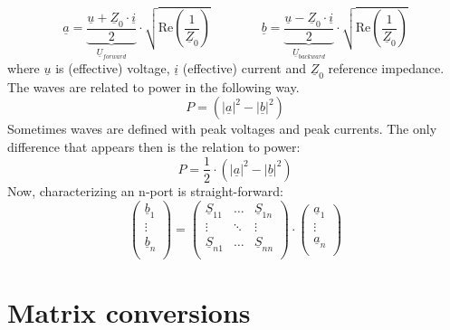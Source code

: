 \begin{equation}
\underline{a} =
  \underbrace{\dfrac{\underline{u}+\underline{Z}_0\cdot \underline{i}}{2}}_{\underline{U}_{forward}}
  \cdot \sqrt{\text{Re}\left(\dfrac{1}{\underline{Z}_0}\right)}
\qquad\qquad
\underline{b} =
  \underbrace{\dfrac{\underline{u}-\underline{Z}_0\cdot \underline{i}}{2}}_{\underline{U}_{backward}}
  \cdot \sqrt{\text{Re}\left(\dfrac{1}{\underline{Z}_0}\right)}
\label{equ:waves}
\end{equation}
where $\underline{u}$ is (effective) voltage, $\underline{i}$
(effective) current and $\underline{Z}_0$ reference
impedance. The waves are related to power in the following way.
\begin{equation}
P = \left( |\underline{a}|^2 - |\underline{b}|^2 \right)
\end{equation}
Sometimes waves are defined with peak voltages and peak currents.
The only difference that appears then is the relation to power:
\begin{equation}
P = \frac{1}{2}\cdot \left( |\underline{a}|^2 - |\underline{b}|^2 \right)
\end{equation}
Now, characterizing an n-port is straight-forward:
\begin{equation}
\begin{pmatrix}
\underline{b}_1\\
\vdots\\
\underline{b}_n\\
\end{pmatrix}
=
\begin{pmatrix}
\underline{S}_{11} & \ldots & \underline{S}_{1n}\\
\vdots & \ddots & \vdots\\
\underline{S}_{n1} & \ldots & \underline{S}_{nn}\\
\end{pmatrix}
\cdot
\begin{pmatrix}
\underline{a}_1\\
\vdots\\
\underline{a}_n\\
\end{pmatrix}
\end{equation}


\section{Matrix conversions}
\label{sec:SparameterConversion}

